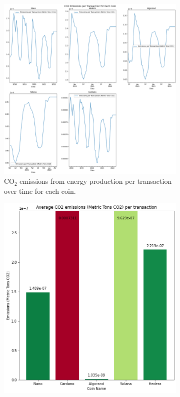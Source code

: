 \documentclass{article}
\begin{document}
\begin{figure}[h!]
  \centering
  \begin{subfigure}[b]{0.5\linewidth}
    \includegraphics[width=\linewidth]{images/emissions_per_transaction.png}
    \caption{$\text{CO}_2$ emissions from energy production per transaction over time for each coin.}
  \end{subfigure}
  \begin{subfigure}[b]{0.45\linewidth}
    \includegraphics[width=\linewidth]{images/average_emissions_per_transaction.png}

\end{subfigure}
\end{figure}
\end{document}

